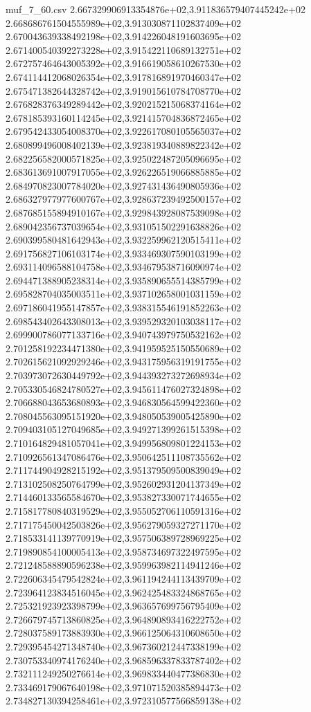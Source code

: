 \begin{filecontents*}{muf_7_60.csv}
2.667329906913354876e+02,3.911836579407445242e+02
2.668686761504555989e+02,3.913030871102837409e+02
2.670043639338492198e+02,3.914226048191603695e+02
2.671400540392273228e+02,3.915422110689132751e+02
2.672757464643005392e+02,3.916619058610267530e+02
2.674114412068026354e+02,3.917816891970460347e+02
2.675471382644328742e+02,3.919015610784708770e+02
2.676828376349289442e+02,3.920215215068374164e+02
2.678185393160114245e+02,3.921415704836872465e+02
2.679542433054008370e+02,3.922617080105565037e+02
2.680899496008402139e+02,3.923819340889822342e+02
2.682256582000571825e+02,3.925022487205096695e+02
2.683613691007917055e+02,3.926226519066885885e+02
2.684970823007784020e+02,3.927431436490805936e+02
2.686327977977600767e+02,3.928637239492500157e+02
2.687685155894910167e+02,3.929843928087539098e+02
2.689042356737039654e+02,3.931051502291638826e+02
2.690399580481642943e+02,3.932259962120515411e+02
2.691756827106103174e+02,3.933469307590103199e+02
2.693114096588104758e+02,3.934679538716090974e+02
2.694471388905238314e+02,3.935890655514385799e+02
2.695828704035003511e+02,3.937102658001031159e+02
2.697186041955147857e+02,3.938315546191852263e+02
2.698543402643308013e+02,3.939529320103038117e+02
2.699900786077133716e+02,3.940743979750532162e+02
2.701258192234471380e+02,3.941959525150550689e+02
2.702615621092929246e+02,3.943175956319191755e+02
2.703973072630449792e+02,3.944393273272698934e+02
2.705330546824780527e+02,3.945611476027324898e+02
2.706688043653680893e+02,3.946830564599422360e+02
2.708045563095151920e+02,3.948050539005425890e+02
2.709403105127049685e+02,3.949271399261515398e+02
2.710164829481057041e+02,3.949956809801224153e+02
2.710926561347086476e+02,3.950642511108735562e+02
2.711744904928215192e+02,3.951379509500839049e+02
2.713102508250764799e+02,3.952602931204137349e+02
2.714460133565584670e+02,3.953827330071744655e+02
2.715817780840319529e+02,3.955052706110591316e+02
2.717175450042503826e+02,3.956279059327271170e+02
2.718533141139770919e+02,3.957506389728969225e+02
2.719890854100005413e+02,3.958734697322497595e+02
2.721248588890596238e+02,3.959963982114941246e+02
2.722606345479542824e+02,3.961194244113439709e+02
2.723964123834516045e+02,3.962425483324868765e+02
2.725321923923398799e+02,3.963657699756795409e+02
2.726679745713860825e+02,3.964890893416222752e+02
2.728037589173883930e+02,3.966125064310608650e+02
2.729395454271348740e+02,3.967360212447338199e+02
2.730753340974176240e+02,3.968596337833787402e+02
2.732111249250276614e+02,3.969833440477386830e+02
2.733469179067640198e+02,3.971071520385894473e+02
2.734827130394258461e+02,3.972310577566859138e+02

\end{filecontents*}
